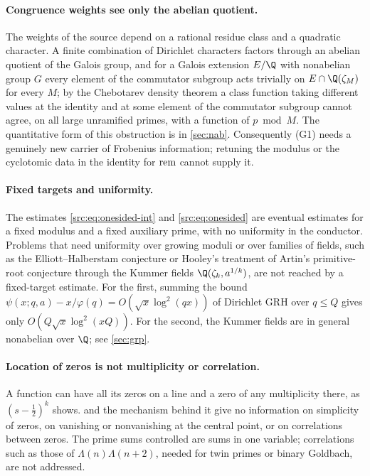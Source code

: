 \paragraph{Congruence weights see only the abelian quotient.}
The weights of the source depend on a rational residue class and a quadratic character. A
finite combination of Dirichlet characters factors through an abelian quotient of the Galois
group, and for a Galois extension $E/\Q$ with nonabelian group $G$ every element of the
commutator subgroup acts trivially on $E\cap\Q(\zeta_M)$ for every $M$; by the Chebotarev
density theorem a class function taking different values at the identity and at some element
of the commutator subgroup cannot agree, on all large unramified primes, with a function of
$p\bmod M$. The quantitative form of this obstruction is in \cref{sec:nab}. Consequently (G1)
needs a genuinely new carrier of Frobenius information; retuning the modulus or the
cyclotomic data in the identity for $\mathrm{rem}$ cannot supply it.

\paragraph{Fixed targets and uniformity.}
The estimates \eqref{src:eq:onesided-int} and \eqref{src:eq:onesided} are eventual estimates
for a fixed modulus and a fixed auxiliary prime, with no uniformity in the conductor. Problems
that need uniformity over growing moduli or over families of fields, such as the
Elliott--Halberstam conjecture or Hooley's treatment of Artin's primitive-root conjecture
through the Kummer fields $\Q(\zeta_k,a^{1/k})$, are not reached by a fixed-target estimate.
For the first, summing the bound
$\psi(x;q,a)-x/\varphi(q)=O(\sqrt x\log^2(qx))$ of Dirichlet GRH over $q\le Q$ gives only
$O(Q\sqrt x\log^2(xQ))$. For the second, the Kummer fields are in general nonabelian over $\Q$;
see \cref{sec:grp}.

\paragraph{Location of zeros is not multiplicity or correlation.}
A function can have all its zeros on a line and a zero of any multiplicity there, as
$(s-\tfrac12)^k$ shows.  and the mechanism behind it give no information on
simplicity of zeros, on vanishing or nonvanishing at the central point, or on correlations
between zeros. The prime sums controlled are sums in one variable; correlations such as those
of $\Lambda(n)\Lambda(n+2)$, needed for twin primes or binary Goldbach, are not addressed.

